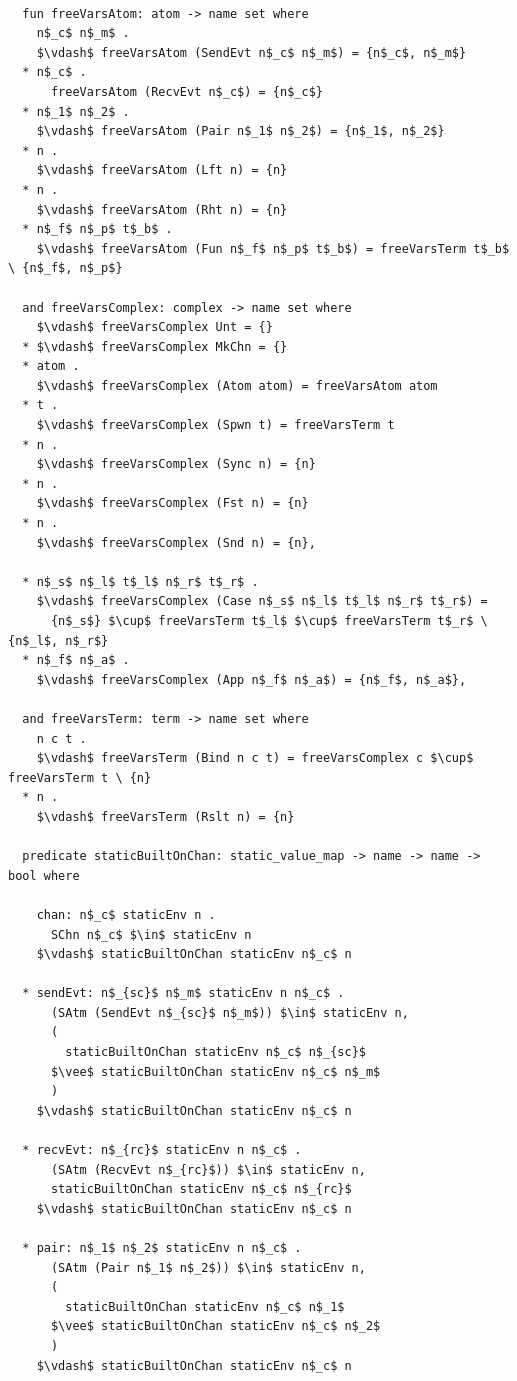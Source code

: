 \documentclass[letterpaper, 11pt]{extarticle}
\begin{document}
\begin{lstlisting}[language=logic, mathescape]

  fun freeVarsAtom: atom -> name set where
    n$_c$ n$_m$ .
    $\vdash$ freeVarsAtom (SendEvt n$_c$ n$_m$) = {n$_c$, n$_m$}
  * n$_c$ .
      freeVarsAtom (RecvEvt n$_c$) = {n$_c$}
  * n$_1$ n$_2$ .
    $\vdash$ freeVarsAtom (Pair n$_1$ n$_2$) = {n$_1$, n$_2$}
  * n .
    $\vdash$ freeVarsAtom (Lft n) = {n}
  * n .
    $\vdash$ freeVarsAtom (Rht n) = {n}
  * n$_f$ n$_p$ t$_b$ .
    $\vdash$ freeVarsAtom (Fun n$_f$ n$_p$ t$_b$) = freeVarsTerm t$_b$ \ {n$_f$, n$_p$}
  
  and freeVarsComplex: complex -> name set where
    $\vdash$ freeVarsComplex Unt = {}
  * $\vdash$ freeVarsComplex MkChn = {}
  * atom .
    $\vdash$ freeVarsComplex (Atom atom) = freeVarsAtom atom
  * t .
    $\vdash$ freeVarsComplex (Spwn t) = freeVarsTerm t
  * n .
    $\vdash$ freeVarsComplex (Sync n) = {n}
  * n .
    $\vdash$ freeVarsComplex (Fst n) = {n}
  * n .
    $\vdash$ freeVarsComplex (Snd n) = {n},

  * n$_s$ n$_l$ t$_l$ n$_r$ t$_r$ .
    $\vdash$ freeVarsComplex (Case n$_s$ n$_l$ t$_l$ n$_r$ t$_r$) = 
      {n$_s$} $\cup$ freeVarsTerm t$_l$ $\cup$ freeVarsTerm t$_r$ \ {n$_l$, n$_r$}
  * n$_f$ n$_a$ .
    $\vdash$ freeVarsComplex (App n$_f$ n$_a$) = {n$_f$, n$_a$},
  
  and freeVarsTerm: term -> name set where
    n c t .
    $\vdash$ freeVarsTerm (Bind n c t) = freeVarsComplex c $\cup$ freeVarsTerm t \ {n}
  * n .
    $\vdash$ freeVarsTerm (Rslt n) = {n}

  predicate staticBuiltOnChan: static_value_map -> name -> name -> bool where

    chan: n$_c$ staticEnv n .
      SChn n$_c$ $\in$ staticEnv n 
    $\vdash$ staticBuiltOnChan staticEnv n$_c$ n

  * sendEvt: n$_{sc}$ n$_m$ staticEnv n n$_c$ . 
      (SAtm (SendEvt n$_{sc}$ n$_m$)) $\in$ staticEnv n,
      (
        staticBuiltOnChan staticEnv n$_c$ n$_{sc}$ 
      $\vee$ staticBuiltOnChan staticEnv n$_c$ n$_m$
      )
    $\vdash$ staticBuiltOnChan staticEnv n$_c$ n

  * recvEvt: n$_{rc}$ staticEnv n n$_c$ . 
      (SAtm (RecvEvt n$_{rc}$)) $\in$ staticEnv n,
      staticBuiltOnChan staticEnv n$_c$ n$_{rc}$
    $\vdash$ staticBuiltOnChan staticEnv n$_c$ n

  * pair: n$_1$ n$_2$ staticEnv n n$_c$ . 
      (SAtm (Pair n$_1$ n$_2$)) $\in$ staticEnv n,
      (
        staticBuiltOnChan staticEnv n$_c$ n$_1$ 
      $\vee$ staticBuiltOnChan staticEnv n$_c$ n$_2$
      )
    $\vdash$ staticBuiltOnChan staticEnv n$_c$ n


\end{lstlisting}
\end{document}
